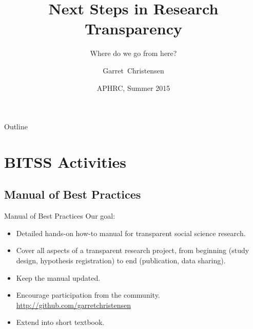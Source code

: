 \documentclass{beamer}
\title[Next Steps in Research Transparency] %
{Next Steps in Research Transparency}
\subtitle
{Where do we go from here?}
\author[Christensen] %
{Garret~Christensen\inst{1}}
\institute[University of California Berkeley] %
{
  \inst{1}%
  UC Berkeley: Berkeley Initiative for Transparency in the Social Sciences\\
  Berkeley Institute for Data Science
  }
\date[APHRC] %
{APHRC, Summer 2015}
\begin{document}
\begin{frame}
  \titlepage
\end{frame}

\begin{frame}{Outline}
\tableofcontents
\end{frame}
\section{BITSS Activities}

\subsection{Manual of Best Practices}
 \begin{frame}{Manual of Best Practices}
 Our goal:
 \begin{itemize}
 \item
 Detailed hands-on how-to manual for transparent social science research. 
 \item 
 Cover all aspects of a transparent research project, from beginning (study design, hypothesis registration) to end (publication, data sharing).
 \item 
 Keep the manual updated.
 \item
 Encourage participation from the community. \url{http://github.com/garretchristensen}
 \item 
 Extend into short textbook.
 \end{itemize}
\end{frame} 
\end{document}
